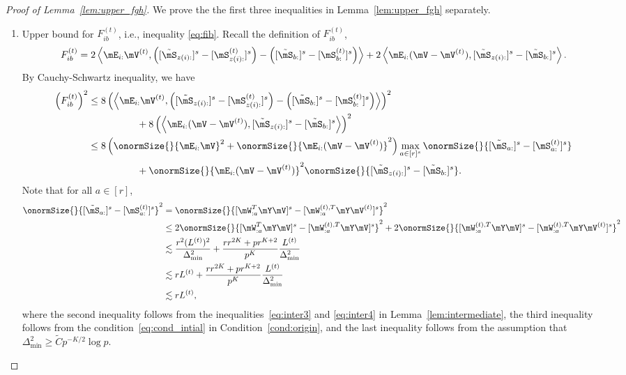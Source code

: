 \documentclass[lettersize,onecolumn,journal]{IEEEtran}
\theoremstyle{definition}
\theoremstyle{definition}
\newcommand{\of}[1]{\left(#1\right)}
\newcommand{\ang}[1]{\left\langle#1\right\rangle}
\begin{document}
\begin{proof}[Proof of Lemma~\ref{lem:upper_fgh}]
We prove the the first three inequalities in Lemma~\ref{lem:upper_fgh} separately.
\begin{enumerate}[wide]
    \item Upper bound for $F_{ib}^{(t)}$, i.e., inequality \eqref{eq:fib}. Recall the definition of $F_{ib}^{(t)}$,
    \begin{align}
         F_{ib}^{(t)} = 2 \ang{\mE_{i:} \mV^{(t)}, \of{ [ \tilde \mS_{z(i):} ]^s  - [\mS_{z(i):}^{(t)} ]^s  }  - \of{  [  \tilde \mS_{b:} ]^s  - [ \mS_{b:}^{(t)} ]^s  }  }  + 2 \ang{ \mE_{i:}(\mV - \mV^{(t)} ), [ \tilde \mS_{z(i):} ]^s - [ \tilde \mS_{b:} ]^s  }.
    \end{align}
    By Cauchy-Schwartz inequality, we have 
    \begin{align}
        \of{F_{ib}^{(t)}}^2 & \leq 8 \of{\ang{\mE_{i:} \mV^{(t)}, \of{ [  \tilde \mS_{z(i):} ]^s  -  [  \mS_{z(i):}^{(t)} ]^s  }  - \of{  [  \tilde \mS_{b:} ]^s  -  [  \mS_{b:}^{(t)} ]^s  }  }  }^2 \\
         & \quad \quad \quad \quad \quad + 8\of{ \ang{ \mE_{i:} (\mV - \mV^{(t)} ), [  \tilde \mS_{z(i):} ]^s - [ \tilde  \mS_{b:} ]^s  }}^2 \\
         & \leq 8 \of{ \onormSize{}{\mE_{i:} \mV}^2 + \onormSize{}{\mE_{i:} ( \mV - \mV^{(t)} )}^2 } \max_{a \in [r]^s} \onormSize{}{  [  \tilde \mS_{a:} ]^s - [   \mS_{a:}^{(t)} ]^s  } \\
          & \quad \quad \quad \quad \quad +\onormSize{}{\mE_{i:} ( \mV - \mV^{(t)} )}^2  \onormSize{}{  [  \tilde \mS_{z(i):} ]^s - [  \tilde \mS_{b:} ]^s  }. \label{eq:fib_decomp}
    \end{align}
    Note that for all $a \in [r]$,
    \begin{align}
        \onormSize{}{  [  \tilde \mS_{a:} ]^s - [   \mS_{a:}^{(t)} ]^s  }^2 &= \onormSize{}{ [ \mW_{:a}^T \mY \mV ]^s - [ \mW_{:a}^{(t),T} \mY \mV^{(t)} ]^s }^2 \\
        &\leq 2 \onormSize{}{ [ \mW_{:a}^T \mY \mV ]^s  - [ \mW_{:a}^{(t),T} \mY \mV ]^s  }^2 + 2 \onormSize{}{[ \mW_{:a}^{(t),T} \mY \mV ]^s - [ \mW_{:a}^{(t),T} \mY \mV^{(t)} ]^s }^2\\
        & \lesssim \frac{ r^2 (L^{(t)})^2}{ \Delta_{\min}^2} + \frac{ r r^{2K} + p r^{K+2}}{p^K} \frac{L^{(t)}}{\Delta_{\min}^2}\\
        & \lesssim  r L^{(t)}+  \frac{ r r^{2K} + p r^{K+2}}{p^K} \frac{L^{(t)}}{\Delta_{\min}^2}\\
        & \lesssim  r L^{(t)},\label{eq:fib_1}
    \end{align}
    where the second inequality follows from the inequalities~\eqref{eq:inter3} and \eqref{eq:inter4} in Lemma~\ref{lem:intermediate}, the third inequality follows from the condition~\eqref{eq:cond_intial} in Condition~\ref{cond:origin}, and the last inequality follows from the assumption that $\Delta_{\min}^2 \geq \tilde C p^{-K/2}\log p$. 
    

\end{enumerate}
\end{proof}
\end{document}
